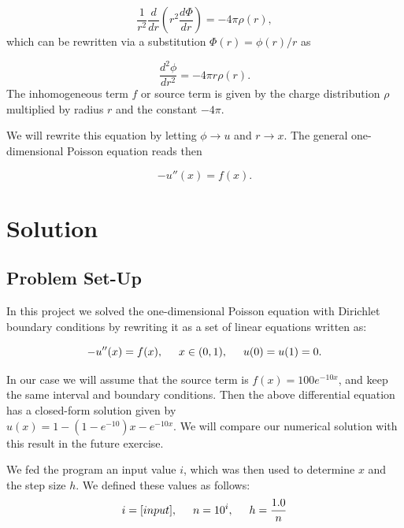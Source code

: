 \documentclass{article}
\begin{document}
		\begin{equation*}
		\frac{1}{r^2}\frac{d}{dr}\left(r^2\frac{d\Phi}{dr}\right) = -4\pi \rho(r),
		\end{equation*}
		which can be rewritten via a substitution $\Phi(r)= \phi(r)/r$ as
		
		\begin{equation*}
		\frac{d^2\phi}{dr^2}= -4\pi r\rho(r).
		\end{equation*}
		The inhomogeneous term $f$ or source term is given by the charge distribution
		$\rho$  multiplied by radius $r$ and the constant $-4\pi$.
		
		We will rewrite this equation by letting $\phi\rightarrow u$ and 
		$r\rightarrow x$. 
		The general one-dimensional Poisson equation reads then
		
		\begin{equation*}
		-u''(x) = f(x).
		\end{equation*}
		

\section{Solution}
\subsection{Problem Set-Up}
In this project we solved the one-dimensional Poisson equation with Dirichlet boundary conditions by rewriting it as a set of linear equations written as:

\begin{equation*}
-u''(x) = f(x), \hspace{0.5cm} x\in(0,1), \hspace{0.5cm} u(0) = u(1) = 0.
\end{equation*}

In our case we will assume  that the source term is 
$f(x) = 100e^{-10x}$, and keep the same interval and boundary  conditions. Then the above differential equation
has a closed-form  solution given by \\$u(x) = 1-(1-e^{-10})x-e^{-10x}$. We will compare
our numerical solution with this result in the future exercise.

We fed the program an input value $i$, which was then used to determine $x$ and the step size $h$. We defined these values as follows:
\begin{equation*}
i = [input], \hspace{0.5cm} n = 10^{i},\hspace{0.5cm}  h = \frac{1.0}{n}
\end{equation*}
\end{document}
